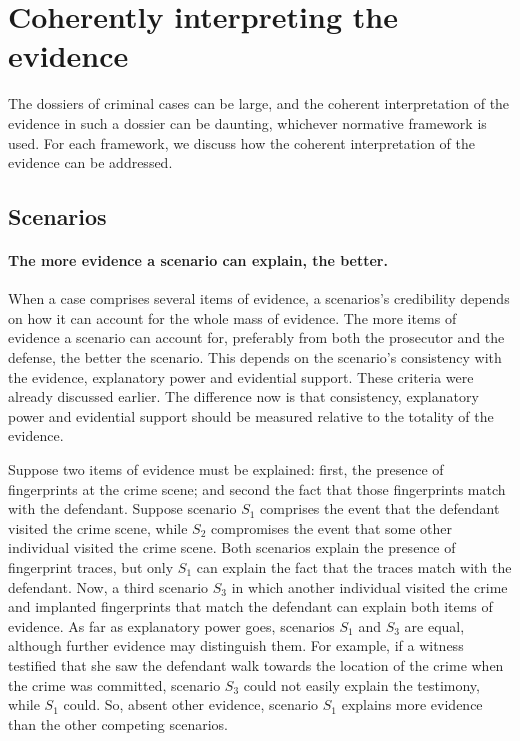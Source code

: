 \documentclass[10pt]{article}
\begin{document}
\section{Coherently interpreting the evidence}
\label{sec:cohint}

The dossiers of criminal cases can be large, and the coherent interpretation of the evidence in such a dossier can 
be daunting, whichever normative framework is used. For each framework, we discuss how the coherent 
interpretation of the evidence can be addressed.

\subsection{Scenarios}


\paragraph{The more evidence a scenario can explain, the better.}

When a case comprises several items of evidence, 
a scenarios's credibility depends on how it can account for the whole mass of evidence.  
 The more items of evidence a scenario can account for, preferably from both the prosecutor and the defense, 
 the better the scenario. This depends on the scenario's consistency with the evidence, 
 explanatory power and evidential support. These criteria were already discussed earlier. 
 The difference now is that consistency, explanatory power and evidential support should 
 be measured relative to the totality of the evidence.  
 
 Suppose two items of evidence must be explained: first, the presence of fingerprints at the crime scene; 
and second the fact that those fingerprints match with the defendant.  Suppose scenario $S_1$ comprises the event that the 
defendant visited the crime scene, while $S_2$ compromises the event that some other individual visited the crime scene. Both scenarios 
explain the presence of fingerprint traces, but only $S_1$ can explain the fact that the traces match with the defendant. Now, a third scenario $S_3$ in which another individual visited the crime and  implanted fingerprints that match the defendant can explain both items of evidence. As far as explanatory power goes, scenarios $S_1$ and $S_3$ are equal, although further evidence may distinguish them. For example, if a witness testified that she saw the defendant walk towards the location of the crime when the crime was committed, scenario $S_3$ could 
not easily explain the testimony, while $S_1$ could. So, absent other evidence, scenario $S_1$ explains more evidence than the other competing scenarios. 
 
\end{document}
